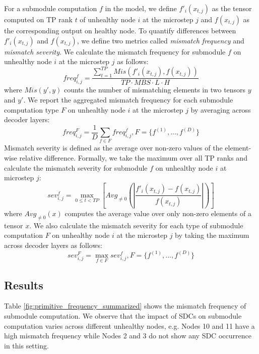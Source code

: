 For a submodule computation $f$ in the model, we define $f'_{i}(x_{t,j})$ as the tensor computed on TP rank $t$ of unhealthy node $i$ at the microstep $j$ and $f(x_{t,j})$ as the corresponding output on healthy node. To quantify differences between $f'_{i}(x_{t,j})$ and $f(x_{t,j})$, we define two metrics called \emph{mismatch frequency} and \emph{mismatch severity}. We calculate the mismatch frequency for submodule $f$ on unhealthy node $i$ at the microstep $j$ as follows:
\begin{equation}
    freq^{f}_{i,j} = \frac{\sum_{t=1}^{TP}{Mis(f'_{i}(x_{t,j}), f(x_{t,j}))}}{TP \cdot MBS \cdot L\cdot H}
\end{equation}
where $Mis(y', y)$ counts the number of mismatching elements in two tensors $y$ and $y'$. We report the aggregated mismatch frequency for each submodule computation type $F$ on unhealthy node $i$ at the microstep $j$ by averaging across decoder layers:
\begin{equation}
    \label{equation:mismatch_frequency}
    freq^{F}_{i,j} = \frac{1}{D}\sum_{f \in F}{freq^{f}_{i,j}}, F=\{f^{(1)},...,f^{(D)}\}
\end{equation} 
Mismatch severity is defined as the average over non-zero values of the element-wise relative difference. Formally, we take the maximum over all TP ranks and calculate the mismatch severity for submodule $f$ on unhealthy node $i$ at microstep $j$:
\begin{equation}
    sev^{f}_{i,j} = \max_{0 \leq t < TP}{\left[
        {Avg_{\neq 0}}\left({
            \left|
                \frac{f'_{i}(x_{t,j}) - f(x_{t,j})  }{f(x_{t,j})}
            \right|
        }\right)
    \right]}
\end{equation}
where $Avg_{\neq 0}(x)$ computes the average value over only non-zero elements of a tensor $x$. We also calculate the mismatch severity for each type of submodule computation $F$ on unhealthy node $i$ at the microstep $j$ by taking the maximum across decoder layers as follows:
\begin{equation}
    \label{equation:mismatch_severity_max_decoder}
    sev^{F}_{i,j} = \max_{f \in F}{sev^{f}_{i,j}}, F=\{f^{(1)},...,f^{(D)}\}
\end{equation}


\subsection{Results} \label{sec:submodule_outputs_results}
Table \ref{fig:primitive_frequency_summarized} shows the mismatch frequency of submodule computation.
We observe that the impact of SDCs on submodule computation varies across different unhealthy nodes, e.g. Nodes 10 and 11 have a high mismatch frequency while Nodes 2 and 3 do not show any SDC occurrence in this setting. 

